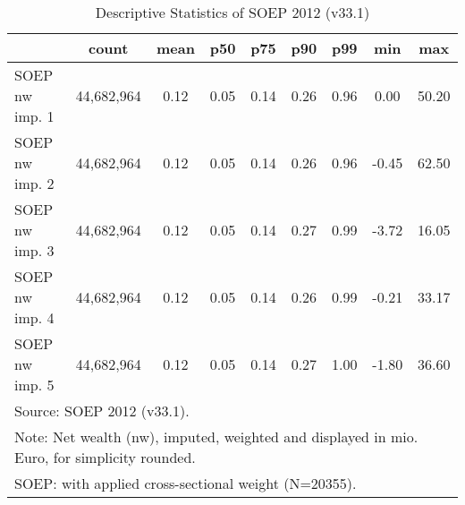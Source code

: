 \begin{table}[htbp]\centering
\def\sym#1{\ifmmode^{#1}\else\(^{#1}\)\fi}
\caption{Descriptive Statistics of SOEP 2012 (v33.1)}
\begin{tabular}{l*{1}{cccccccc}}
\hline\hline
                                            &       count&        mean&         p50&         p75&         p90&         p99&         min&         max\\
\hline
SOEP nw imp. 1                              &  44,682,964&        0.12&        0.05&        0.14&        0.26&        0.96&        0.00&       50.20\\
SOEP nw imp. 2                              &  44,682,964&        0.12&        0.05&        0.14&        0.26&        0.96&       -0.45&       62.50\\
SOEP nw imp. 3                              &  44,682,964&        0.12&        0.05&        0.14&        0.27&        0.99&       -3.72&       16.05\\
SOEP nw imp. 4                              &  44,682,964&        0.12&        0.05&        0.14&        0.26&        0.99&       -0.21&       33.17\\
SOEP nw imp. 5                              &  44,682,964&        0.12&        0.05&        0.14&        0.27&        1.00&       -1.80&       36.60\\
\hline\hline
\multicolumn{9}{l}{\footnotesize Source: SOEP 2012 (v33.1).}\\
\multicolumn{9}{l}{\footnotesize Note: Net wealth (nw), imputed, weighted and displayed in mio. Euro, for simplicity rounded.}\\
\multicolumn{9}{l}{\footnotesize SOEP: with applied cross-sectional weight (N=20355).}\\
\end{tabular}
\end{table}

